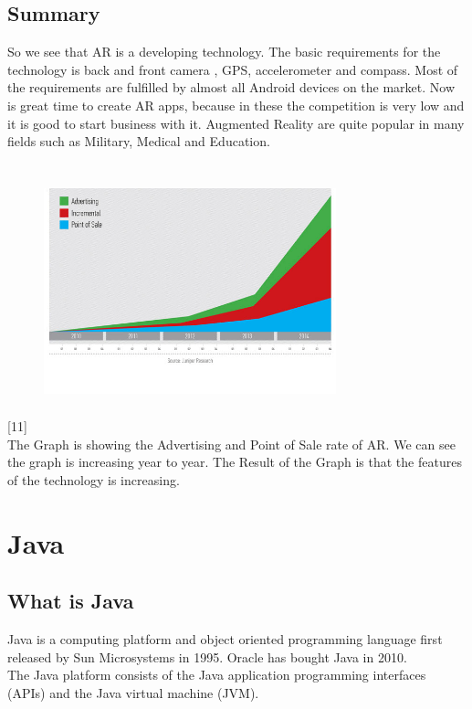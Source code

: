 \subsection{Summary}
So we see that AR is a developing technology. The basic requirements for the technology is back and front camera , GPS, accelerometer and compass. Most of the requirements are fulfilled by almost all Android devices on the market. Now is great time to create AR apps, because in these the competition is very low and it is good to start business with it. Augmented Reality are quite popular in many fields such as Military, Medical and Education.
\\
\\
\begin{figure}[H]
\centering
\includegraphics[width=240pt,height=180pt,keepaspectratio]{graphics/statistics.png}
\caption{\cite{javaObjectClass}}
\end{figure}
[11]
\\
The Graph is showing the Advertising and Point of Sale rate of AR. We can see the graph is increasing year to year. The Result of the Graph is that the features of the technology is increasing.

\section{Java}
\subsection{What is Java}
Java is a computing platform and object oriented programming language first released by Sun Microsystems in 1995. Oracle has bought Java in 2010.\cite{JavaWhat}
\\



The Java platform consists of the Java application programming interfaces (APIs) and the Java virtual machine (JVM).
\\



